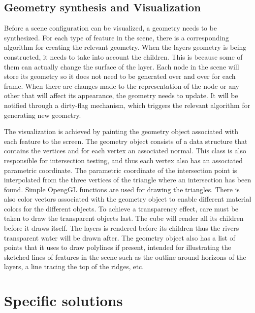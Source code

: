 \documentclass[a4paper,12pt]{report}
\begin{document}
\subsection{Geometry synthesis and Visualization}
Before a scene configuration can be visualized, a geometry needs to be synthesized. For each type of feature in the scene, there is a corresponding algorithm for creating the relevant geometry. When the layers geometry is being constructed, it needs to take into account the children. This is because some of them can actually change the surface of the layer. Each node in the scene will store its geometry so it does not need to be generated over and over for each frame. When there are changes made to the representation of the node or any other that will affect its appearance, the geometry needs to update. It will be notified through a dirty-flag mechanism, which triggers the relevant algorithm for generating new geometry.

The visualization is achieved by painting the geometry object associated with each feature to the screen. The geometry object consists of a data structure that contains the vertices and for each vertex an associated normal. This class is also responsible for intersection testing, and thus each vertex also has an associated parametric coordinate. The parametric coordinate of the intersection point is interpolated from the three vertices of the triangle where an intersection has been found. Simple OpengGL functions are used for drawing the triangles. There is also color vectors associated with the geometry object to enable different material colors for the different objects. To achieve a transparency effect, care must be taken to draw the transparent objects last. The cube will render all its children before it draws itself. The layers is rendered before its children thus the rivers transparent water will be drawn after. The geometry object also has a list of points that it uses to draw polylines if present, intended for 
illustrating the sketched lines of features in the scene such as the outline around horizons of the layers, a line tracing the top of the ridges, etc.

\section{Specific solutions}
\label{subsec:indepth}
\end{document}
